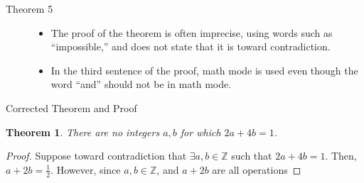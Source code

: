 \documentclass[9pt]{extarticle}
\newtheorem{theorem}{Theorem}
\newcommand{\Z}{\mathbb{Z}}
\begin{document}
  \begin{description}
    \item[Theorem 5]\hfill
      \begin{itemize}
        \item The proof of the theorem is often imprecise, using words such as ``impossible,'' and does not state that it is toward contradiction.
        \item In the third sentence of the proof, math mode is used even though the word ``and'' should not be in math mode.
      \end{itemize}
  \end{description}
  \begin{problem}{Corrected Theorem and Proof}
    \begin{theorem}
      There are no integers $a,b$ for which $2a + 4b = 1$.
    \end{theorem}
    \begin{proof}
      Suppose toward contradiction that $\exists a,b\in \Z$ such that $2a + 4b = 1$. Then, $a + 2b = \frac{1}{2}$. However, since $a,b\in\Z$, and $a + 2b$ are all operations 
    \end{proof}
  \end{problem}
\end{document}
